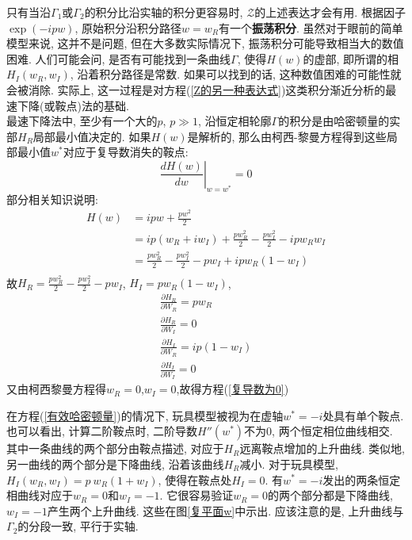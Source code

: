 只有当沿$\Gamma_1$或$\Gamma_2$的积分比沿实轴的积分更容易时, $\mathcal{Z}$的上述表达才会有用. 根据因子$\exp(-ipw)$, 原始积分沿积分路径$w=w_R$有一个\textbf{振荡积分}. 虽然对于眼前的简单模型来说, 这并不是问题, 但在大多数实际情况下, 振荡积分可能导致相当大的数值困难. 人们可能会问, 是否有可能找到一条曲线$\Gamma$, 使得$H(w)$的虚部, 即所谓的相$H_I(w_R,w_I)$, 沿着积分路径是常数. 如果可以找到的话, 这种数值困难的可能性就会被消除. 实际上, 这一过程是对方程(\ref{Z的另一种表达式})这类积分渐近分析的最速下降(或鞍点)法的基础. \\

最速下降法中, 至少有一个大的$p$, $p\gg1$, 沿恒定相轮廓$\Gamma$的积分是由哈密顿量的实部$H_R$局部最小值决定的. 如果$H(w)$是解析的, 那么由柯西-黎曼方程得到这些局部最小值$w^*$对应于复导数消失的鞍点:\\
\begin{equation}
\left. \frac{dH(w)}{dw}\right|_{w=w^*} = 0 \label{复导数为0}
\end{equation}
部分相关知识说明:\\
 \begin{equation}
 \begin{aligned}
 H(w) &= ipw+\frac{pw^2}{2}\\
 &=ip(w_R+iw_I)+\frac{pw_R^2}{2}-\frac{pw_I^2}{2}-ipw_Rw_I\\
 &=\frac{pw_R^2}{2}-\frac{pw_I^2}{2}-pw_I +ipw_R(1-w_I)\\
 \end{aligned}
 \end{equation}
 故$H_R = \frac{pw_R^2}{2}-\frac{pw_I^2}{2}-pw_I$,  $H_I=pw_R(1-w_I)$,\\

 \begin{gather}
\frac{ \partial{H_R} }{\partial{W_R}}=pw_R\\
\frac{ \partial{H_R} }{\partial{W_I}}=0\\
\frac{ \partial{H_I} }{\partial{W_R}}=ip(1-w_I)\\
\frac{ \partial{H_I} }{\partial{W_I}}=0
\end{gather}
又由柯西黎曼方程得$w_R = 0$,$w_I=0$,故得方程(\ref{复导数为0})


在方程(\ref{有效哈密顿量})的情况下, 玩具模型被视为在虚轴$w^* = -i$处具有单个鞍点. 也可以看出, 计算二阶鞍点时, 二阶导数$H''(w^*)$不为0, 两个恒定相位曲线相交. 其中一条曲线的两个部分由鞍点描述, 对应于$H_R$远离鞍点增加的上升曲线. 类似地, 另一曲线的两个部分是下降曲线, 沿着该曲线$H_R$减小. 对于玩具模型, $H_I(w_R,w_I) = p \ w_R(1+w_I)$, 使得在鞍点处$H_I = 0$. 有$w^* = -i$发出的两条恒定相曲线对应于$w_R=0$和$w_I=-1$. 它很容易验证$w_R=0$的两个部分都是下降曲线, $w_I=-1$产生两个上升曲线. 这些在图\ref{复平面w}中示出. 应该注意的是, 上升曲线与$\Gamma_2$的分段一致, 平行于实轴. \\

